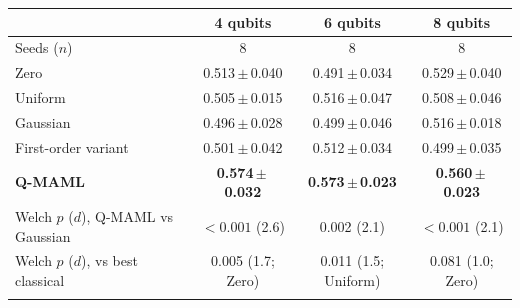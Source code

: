\begin{tabular}{@{}lccc@{}}
\toprule
& 4 qubits & 6 qubits & 8 qubits \\
\midrule
Seeds ($n$) & 8 & 8 & 8 \\
\midrule
Zero & 0.513\,$\pm$\,0.040 & 0.491\,$\pm$\,0.034 & 0.529\,$\pm$\,0.040 \\
Uniform & 0.505\,$\pm$\,0.015 & 0.516\,$\pm$\,0.047 & 0.508\,$\pm$\,0.046 \\
Gaussian & 0.496\,$\pm$\,0.028 & 0.499\,$\pm$\,0.046 & 0.516\,$\pm$\,0.018 \\
First-order variant & 0.501\,$\pm$\,0.042 & 0.512\,$\pm$\,0.034 & 0.499\,$\pm$\,0.035 \\
\textbf{Q-MAML} & \textbf{0.574\,$\pm$\,0.032} & \textbf{0.573\,$\pm$\,0.023} & \textbf{0.560\,$\pm$\,0.023} \\
\midrule
Welch $p$ ($d$), Q-MAML vs Gaussian & $<0.001$ (2.6) & 0.002 (2.1) & $<0.001$ (2.1) \\
Welch $p$ ($d$), vs best classical & 0.005 (1.7; Zero) & 0.011 (1.5; Uniform) & 0.081 (1.0; Zero) \\
\botrule
\end{tabular}
